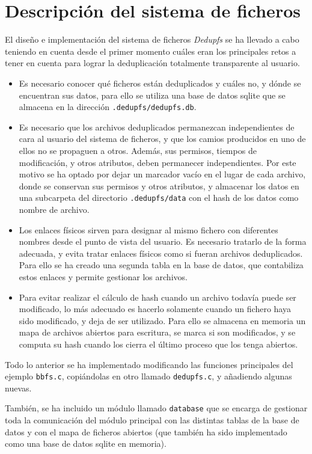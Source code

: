 \documentclass[12pt,a4paper]{article}
\begin{document}
\newpage
\section{Descripción del sistema de ficheros}

El diseño e implementación del sistema de ficheros \emph{Dedupfs} se ha llevado a cabo teniendo en cuenta desde el primer momento cuáles eran los principales retos a tener en cuenta para lograr la deduplicación totalmente transparente al usuario.
\begin{itemize}
 \item Es necesario conocer qué ficheros están deduplicados y cuáles no, y dónde se encuentran sus datos, para ello se utiliza una base de datos sqlite que se almacena en la dirección \texttt{\small .dedupfs/dedupfs.db}.
 \item Es necesario que los archivos deduplicados permanezcan independientes de cara al usuario del sistema de ficheros, y que los camios producidos en uno de ellos no se propaguen a otros. Además, sus permisos, tiempos de modificación, y otros atributos, deben permanecer independientes. Por este motivo se ha optado por dejar un marcador vacío en el lugar de cada archivo, donde se conservan sus permisos y otros atributos, y almacenar los datos en una subcarpeta del directorio \texttt{\small .dedupfs/data} con el hash de los datos como nombre de archivo.
 \item Los enlaces físicos sirven para designar al mismo fichero con diferentes nombres desde el punto de vista del usuario. Es necesario tratarlo de la forma adecuada, y evita tratar enlaces físicos como si fueran archivos deduplicados. Para ello se ha creado una segunda tabla en la base de datos, que contabiliza estos enlaces y permite gestionar los archivos.
 \item Para evitar realizar el cálculo de hash cuando un archivo todavía puede ser modificado, lo más adecuado es hacerlo solamente cuando un fichero haya sido modificado, y deja de ser utilizado. Para ello se almacena en memoria un mapa de archivos abiertos para escritura, se marca si son modificados, y se computa su hash cuando los cierra el último proceso que los tenga abiertos.
\end{itemize}

Todo lo anterior se ha implementado modificando las funciones principales del ejemplo \texttt{\small bbfs.c}, copiándolas en otro llamado \texttt{\small dedupfs.c}, y añadiendo algunas nuevas.

También, se ha incluido un módulo llamado \texttt{\small database} que se encarga de gestionar toda la comunicación del módulo principal con las distintas tablas de la base de datos y con el mapa de ficheros abiertos (que también ha sido implementado como una base de datos sqlite en memoria).
\end{document}
